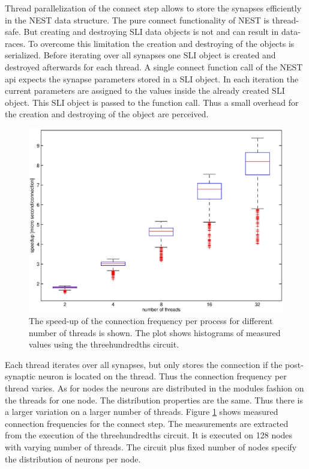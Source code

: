 Thread parallelization of the connect step allows to store the synapses efficiently in the NEST data structure.
The pure connect functionality of NEST is thread-safe. But creating and destroying SLI data objects is not and can result
in data-races. To overcome this limitation the creation and destroying of the objects is serialized.
Before iterating over all synapses one SLI object is created and destroyed afterwards for each thread.
A single connect function call of the NEST api expects the synapse parameters stored in a SLI object.
In each iteration the current parameters are assigned to the values inside the already created SLI object.
This SLI object is passed to the function call.
Thus a small overhead for the creation and destroying of the object are perceived.
\begin{figure}[ht!]
\centering
\includegraphics[scale=0.5]{pictures/boxplot_new_con_dt_1_300_speedup.eps}
\caption{The speed-up of the connection frequency per process for different number of threads is shown.
The plot shows histograms of measured values using the threehundredths circuit.}
\label{boxplotnewcon}
\end{figure}
Each thread iterates over all synapses, but only stores the connection if the post-synaptic neuron is located on
the thread. Thus the connection frequency per thread varies.
As for nodes the neurons are distributed in the modules fashion on the threads for one node.
The distribution properties are the same. Thus there is a larger variation on a larger number of threads.
Figure \ref{boxplotnewcon} shows measured connection frequencies for the connect step. The measurements are
extracted from the execution of the threehundredths circuit. It is executed on 128 nodes with varying number of
threads. The circuit plus fixed number of nodes specify the distribution of neurons per node.

